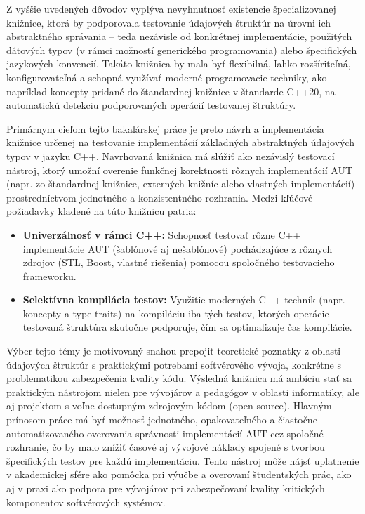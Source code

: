 \documentclass[11pt]{article}
\begin{document}
Z vyššie uvedených dôvodov vyplýva nevyhnutnosť existencie špecializovanej knižnice, ktorá by podporovala testovanie údajových štruktúr na úrovni ich abstraktného správania -- teda nezávisle od konkrétnej implementácie, použitých dátových typov (v rámci možností generického programovania) alebo špecifických jazykových konvencií. Takáto knižnica by mala byť flexibilná, ľahko rozšíriteľná, konfigurovateľná a schopná využívať moderné programovacie techniky, ako napríklad koncepty pridané do štandardnej knižnice v štandarde C++20, na automatickú detekciu podporovaných operácií testovanej štruktúry.

Primárnym cieľom tejto bakalárskej práce je preto návrh a implementácia knižnice určenej na testovanie implementácií základných abstraktných údajových typov v jazyku C++. Navrhovaná knižnica má slúžiť ako nezávislý testovací nástroj, ktorý umožní overenie funkčnej korektnosti rôznych implementácií AUT (napr. zo štandardnej knižnice, externých knižníc alebo vlastných implementácií) prostredníctvom jednotného a konzistentného rozhrania. Medzi kľúčové požiadavky kladené na túto knižnicu patria:

\begin{itemize}
  \item \textbf{Univerzálnosť v rámci C++:} Schopnosť testovať rôzne C++ implementácie AUT (šablónové aj nešablónové) pochádzajúce z rôznych zdrojov (STL, Boost, vlastné riešenia) pomocou spoločného testovacieho frameworku.
  \item \textbf{Selektívna kompilácia testov:} Využitie moderných C++ techník (napr. koncepty a type traits) na kompiláciu iba tých testov, ktorých operácie testovaná štruktúra skutočne podporuje, čím sa optimalizuje čas kompilácie.
\end{itemize}

Výber tejto témy je motivovaný snahou prepojiť teoretické poznatky z oblasti údajových štruktúr s praktickými potrebami softvérového vývoja, konkrétne s problematikou zabezpečenia kvality kódu. Výsledná knižnica má ambíciu stať sa praktickým nástrojom nielen pre vývojárov a pedagógov v oblasti informatiky, ale aj projektom s voľne dostupným zdrojovým kódom (open-source). Hlavným prínosom práce má byť možnosť jednotného, opakovateľného a čiastočne automatizovaného overovania správnosti implementácií AUT cez spoločné rozhranie, čo by malo znížiť časové aj vývojové náklady spojené s tvorbou špecifických testov pre každú implementáciu. Tento nástroj môže nájsť uplatnenie v akademickej sfére ako pomôcka pri výučbe a overovaní študentských prác, ako aj v praxi ako podpora pre vývojárov pri zabezpečovaní kvality kritických komponentov softvérových systémov.
\end{document}
